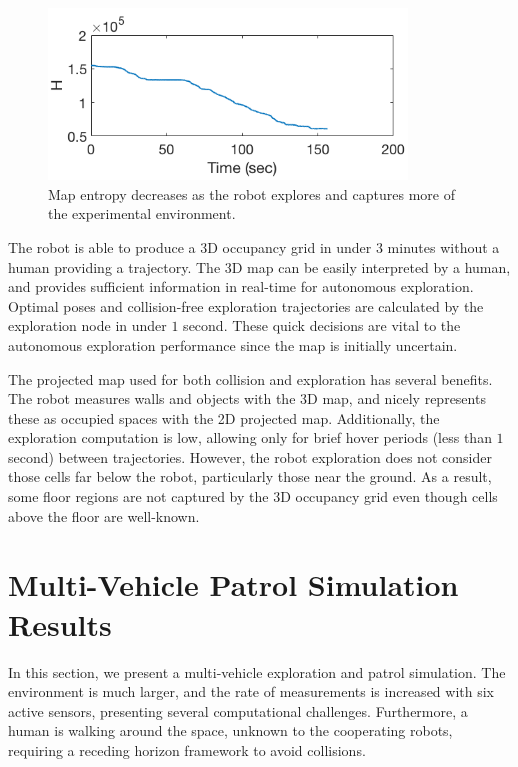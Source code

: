 \documentclass[smallextended]{svjour3}       %
\begin{document}
\begin{figure}[!t]
	\centering
	\includegraphics[width=0.85\textwidth]{entropy_experiment_aspect3by1.png}
	\caption{Map entropy decreases as the robot explores and captures more of the experimental environment.}
	\label{fig:expH}
\end{figure}

The robot is able to produce a 3D occupancy grid in under $3$ minutes without a human providing a trajectory. The 3D map can be easily interpreted by a human, and provides sufficient information in real-time for autonomous exploration. Optimal poses and collision-free exploration trajectories are calculated by the exploration node in under $1$ second. These quick decisions are vital to the autonomous exploration performance since the map is initially uncertain.

The projected map used for both collision and exploration has several benefits. The robot measures walls and objects with the 3D map, and nicely represents these as occupied spaces with the 2D projected map. Additionally, the exploration computation is low, allowing only for brief hover periods (less than $1$ second) between trajectories. However, the robot exploration does not consider those cells far below the robot, particularly those near the ground. As a result, some floor regions are not captured by the 3D occupancy grid even though cells above the floor are well-known.


\section{Multi-Vehicle Patrol Simulation Results}
\label{sec:PatrolSimulation}

In this section, we present a multi-vehicle exploration and patrol simulation. The environment is much larger, and the rate of measurements is increased with six active sensors, presenting several computational challenges. Furthermore, a human is walking around the space, unknown to the cooperating robots, requiring a receding horizon framework to avoid collisions.
\end{document}
